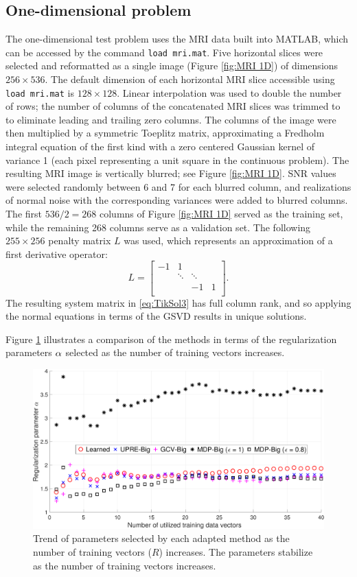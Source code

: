 \documentclass[12pt]{article}
\begin{document}
\subsection{One-dimensional problem} \label{sec:1D}
The one-dimensional test problem uses the MRI data built into MATLAB, which can be accessed by the command \texttt{load mri.mat}. Five horizontal slices were selected and reformatted as a single image (Figure \ref{fig:MRI 1D}) of dimensions $256 \times 536$. The default dimension of each horizontal MRI slice accessible using \texttt{load mri.mat} is $128 \times 128$. Linear interpolation was used to double the number of rows; the number of columns of the concatenated MRI slices was trimmed to to eliminate leading and trailing zero columns. The columns of the image were then multiplied by a symmetric Toeplitz matrix, approximating a Fredholm integral equation of the first kind with a zero centered Gaussian kernel of variance 1 (each pixel representing a unit square in the continuous problem). The resulting MRI image is vertically blurred; see Figure \ref{fig:MRI 1D}. SNR values were selected randomly between 6 and 7 for each blurred column, and realizations of normal noise with the corresponding variances were added to blurred columns. The first $536/2 = 268$ columns of Figure \ref{fig:MRI 1D} served as the training set, while the remaining 268 columns serve as a validation set.  The following $255 \times 256$ penalty matrix $L$ was used, which represents an approximation of a first derivative operator:
\[L = \begin{bmatrix}
-1 & 1 & &  \\
 & \ddots &  \ddots & \\
 & & -1 & 1 \\
\end{bmatrix}.\]
The resulting system matrix in \eqref{eq:TikSol3} has full column rank, and so applying the normal equations in terms of the GSVD results in unique solutions. \par 
Figure \ref{fig:Parameters 1D MRI} illustrates a comparison of the methods in terms of the regularization parameters $\alpha$ selected as the number of training vectors increases. 

\begin{figure}[ht]
\includegraphics[width=1.0\textwidth]{Figures/Parameters1D_mri.pdf}
\caption{Trend of parameters selected by each adapted method as the number of training vectors ($R$) increases. The parameters stabilize as the number of training vectors increases.}
\label{fig:Parameters 1D MRI}
\end{figure}
\end{document}
